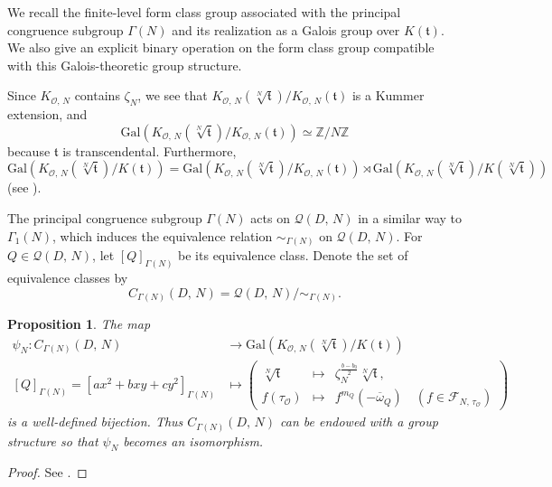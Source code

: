 \documentclass[reqno,11pt]{article}
\theoremstyle{plain} %
\newtheorem{proposition}[theorem]{\indent\sc Proposition}
\theoremstyle{definition} %
\begin{document}
We recall the finite-level form class group
associated with the principal congruence subgroup $\Gamma(N)$  and
its realization as a Galois group over $K(\mathfrak{t})$.
We also give an explicit binary operation on the form class group
compatible with this Galois-theoretic group structure.
\par
Since $K_{\mathcal{O},\,N}$ contains $\zeta_N$, 
we see that
$K_{\mathcal{O},\,N}(\sqrt[N]{\mathfrak{t}})/K_{\mathcal{O},\,N}(\mathfrak{t})$
is a Kummer extension, and
\begin{equation*}
\mathrm{Gal}\left(K_{\mathcal{O},\,N}(\sqrt[N]{\mathfrak{t}})/K_{\mathcal{O},\,N}(\mathfrak{t})\right)
\simeq\mathbb{Z}/N\mathbb{Z}
\end{equation*}
because $\mathfrak{t}$ is transcendental. 
Furthermore, 
\begin{equation*}
\mathrm{Gal}\left(K_{\mathcal{O},\,N}(\sqrt[N]{\mathfrak{t}})/K(\mathfrak{t})\right)
=\mathrm{Gal}\left(K_{\mathcal{O},\,N}(\sqrt[N]{\mathfrak{t}})/K_{\mathcal{O},\,N}(\mathfrak{t})\right)
\rtimes\mathrm{Gal}\left(K_{\mathcal{O},\,N}(\sqrt[N]{\mathfrak{t}})/K(
\sqrt[N]{\mathfrak{t}})\right)
\end{equation*}
(see \cite[Lemma 12.4]{J-K-S-Y}). 
\par
The principal congruence subgroup $\Gamma(N)$ acts on $\mathcal{Q}(D,\,N)$
in a similar way to $\Gamma_1(N)$, which induces
the equivalence relation $\sim_{\Gamma(N)}$ on $\mathcal{Q}(D,\,N)$. 
For $Q\in\mathcal{Q}(D,\,N)$, let $[Q]_{\Gamma(N)}$ be its equivalence class. 
Denote the set of equivalence classes by 
\begin{equation*}
C_{\Gamma(N)}(D,\,N)=\mathcal{Q}(D,\,N)/\sim_{\Gamma(N)}.
\end{equation*}

\begin{proposition}\label{isomorphism2}
The map
\begin{align*}
\psi_N:C_{\Gamma(N)}(D,\,N)&\rightarrow
\mathrm{Gal}\left(K_{\mathcal{O},\,N}(\sqrt[N]{\mathfrak{t}})/K(\mathfrak{t})\right)\\
[Q]_{\Gamma(N)}=
[ax^2+bxy+cy^2]_{\Gamma(N)}&\mapsto
\left(\begin{array}{lcl}
\sqrt[N]{\mathfrak{t}}&\mapsto& 
\zeta_N^{\frac{b-b_0}{2}}\sqrt[N]{\mathfrak{t}},\\
f(\tau_\mathcal{O})&\mapsto&
f^{m_Q}(-\overline{\omega}_Q)\quad(f\in\mathcal{F}_{N,\,\tau_\mathcal{O}})
\end{array}\right)
\end{align*}
is a well-defined bijection. Thus
$C_{\Gamma(N)}(D,\,N)$ can be endowed
with a group structure so that $\psi_N$ becomes an isomorphism. 
\end{proposition}
\begin{proof}
See \cite[Corollary 12.6]{J-K-S-Y}. 
\end{proof}
\end{document}
